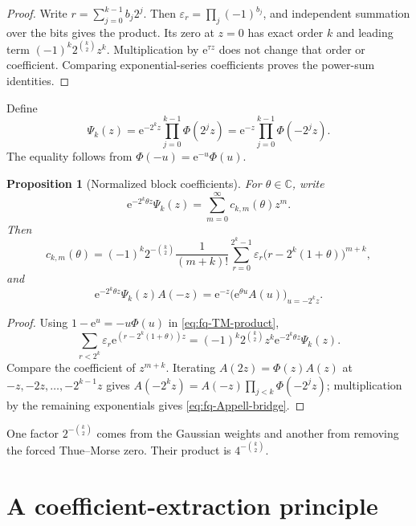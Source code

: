 \documentclass[11pt,oneside,openany]{book}
\newtheorem{proposition}[theorem]{Proposition}
\theoremstyle{definition}
\theoremstyle{remark}
\newcommand{\C}{\mathbb C}
\newcommand{\e}{\mathrm e}
\begin{document}
\begin{proof}
Write $r=\sum_{j=0}^{k-1}b_j2^j$.  Then
$\varepsilon_r=\prod_j(-1)^{b_j}$, and independent summation over the bits
gives the product.  Its zero at $z=0$ has exact order $k$ and leading term
$(-1)^k2^{\binom k2}z^k$.  Multiplication by $\e^{\tau z}$ does not change
that order or coefficient.  Comparing exponential-series coefficients proves
the power-sum identities.
\end{proof}

Define
\begin{equation}
 \Psi_k(z)=\e^{-2^kz}\prod_{j=0}^{k-1}\Phi(2^jz)
          =\e^{-z}\prod_{j=0}^{k-1}\Phi(-2^jz).
 \label{eq:fq-Psi}
\end{equation}
The equality follows from $\Phi(-u)=\e^{-u}\Phi(u)$.

\begin{proposition}[Normalized block coefficients]
\label{prop:fq-normalized-block}
For $\theta\in\C$, write
\begin{equation}
 \e^{-2^k\theta z}\Psi_k(z)
 =\sum_{m=0}^{\infty}c_{k,m}(\theta)z^m.
 \label{eq:fq-ckm-def}
\end{equation}
Then
\begin{equation}
 c_{k,m}(\theta)=
 (-1)^k2^{-\binom k2}\frac1{(m+k)!}
 \sum_{r=0}^{2^k-1}\varepsilon_r
 \bigl(r-2^k(1+\theta)\bigr)^{m+k},
 \label{eq:fq-ckm-power-sum}
\end{equation}
and
\begin{equation}
 \e^{-2^k\theta z}\Psi_k(z)A(-z)
 =\e^{-z}\bigl(\e^{\theta u}A(u)\bigr)_{u=-2^kz}.
 \label{eq:fq-Appell-bridge}
\end{equation}
\end{proposition}

\begin{proof}
Using $1-\e^u=-u\Phi(u)$ in \eqref{eq:fq-TM-product},
\[
 \sum_{r<2^k}\varepsilon_r
 \e^{(r-2^k(1+\theta))z}
 =(-1)^k2^{\binom k2}z^k
 \e^{-2^k\theta z}\Psi_k(z).
\]
Compare the coefficient of $z^{m+k}$.  Iterating
$A(2z)=\Phi(z)A(z)$ at $-z,-2z,\ldots,-2^{k-1}z$ gives
$A(-2^kz)=A(-z)\prod_{j<k}\Phi(-2^jz)$; multiplication by the remaining
exponentials gives \eqref{eq:fq-Appell-bridge}.
\end{proof}

One factor $2^{-\binom k2}$ comes from the Gaussian weights and another from
removing the forced Thue--Morse zero.  Their product is
$4^{-\binom k2}$.

\section{A coefficient-extraction principle}
\end{document}
